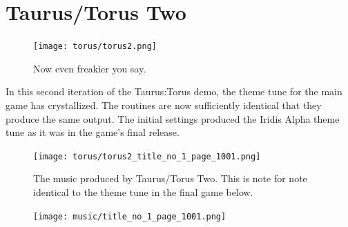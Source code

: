\section{Taurus/Torus Two}
\begin{figure}[H]
{
  \begin{adjustbox}{width=11cm,center}
  \texttt{[image: torus/torus2.png]}%
    \end{adjustbox}
}\caption[]{Now even freakier you say.}
\end{figure}

In this second iteration of the Taurus:Torus demo, the theme tune for the main game has crystallized. The routines are now sufficiently identical
that they produce the same output. The initial settings produced the Iridis Alpha theme tune as it was in the game's final release.

\lstset{style=6502Style}



\begin{figure}[H]
{
  \begin{adjustbox}{width=14cm,center}
    \texttt{[image: torus/torus2\_title\_no\_1\_page\_1001.png]}%
  \end{adjustbox}
}\caption[]{The music produced by Taurus/Torus Two. This is note for note identical to the theme tune in the final game below.}
\end{figure}

\begin{figure}[H]
{
  \begin{adjustbox}{width=14cm,center}
    \texttt{[image: music/title\_no\_1\_page\_1001.png]}%
  \end{adjustbox}
}
\end{figure}


